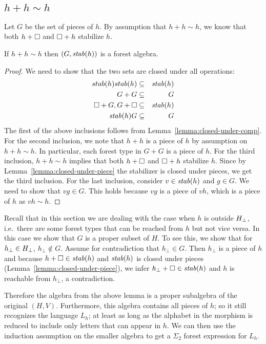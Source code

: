 \documentclass{LMCS}
\begin{document}
\subsection{\texorpdfstring{$h + h \sim h$}{h+h sim h}}
\label{sec:h-preserves-itself}
Let $G$ be the set of pieces of $h$. By assumption that $h+h \sim h$,
we know that both $h + \Box$ and $\Box + h$ stabilize $h$. 
\begin{lem}\label{lem:sub-forest-algebra}
  If $h + h \sim h$ then $(G,\mathit{stab}(h))$ is a forest
  algebra.
\end{lem}
\begin{proof}
    We need to show that the two sets are closed under all operations:
\begin{eqnarray*}
    stab(h) stab(h) & \subseteq &\mathit{stab}(h) \\
    G +  G &  \subseteq & G \\
 \Box +G, G + \Box     & \subseteq & \mathit{stab}(h) \\
    \mathit{stab}(h)  G & \subseteq & G
\end{eqnarray*}
  The first of the above inclusions follows from
  Lemma~\ref{lemma:closed-under-comp}. For the second inclusion, we
  note that $h+h$ is a piece of $h$ by assumption on $h+h \sim h$. In
  particular, each forest type in $G + G$ is a piece of $h$. For the
  third inclusion, $h+h \sim h$ implies that both $h + \Box$ and
  $\Box + h$ stabilize $h$. Since by
  Lemma~\ref{lemma:closed-under-piece} the stabilizer is closed under
  pieces, we get the third inclusion. For the last inclusion, consider
  $v \in \mathit{stab}(h)$ and $g \in G$. We need to show that $vg \in
  G$. This holds because $vg$ is a piece of $vh$, which is a piece of
  $h$ as $vh \sim h$.
\end{proof}


Recall that in this section we are dealing with the case when $h$ is
outside ${H_\bot}$, i.e.~there are some forest types that can be
reached from $h$ but not vice versa. In this case we show that $G$ is a proper
subset of $H$. To see this, we show that for $h_\bot \in {H_\bot}$, $h_\bot
\not\in G$. Assume for contradiction that $h_\bot \in G$. Then $h_\bot$ is a
piece of $h$ and because $h + \Box \in \mathit{stab}(h)$ and $\mathit{stab}(h)$ is closed
under pieces (Lemma~\ref{lemma:closed-under-piece}), we infer $h_\bot + \Box
\in \mathit{stab}(h)$ and $h$ is reachable from $h_\bot$, a contradiction.

Therefore the algebra from the above lemma is a
proper subalgebra of the original $(H,V)$.  Furthermore, this algebra
contains all pieces of $h$; so it still recognizes the language $L_h$;
at least as long as the alphabet in the morphism is reduced to include
only letters that can appear in $h$.  We can then use the induction
assumption on the smaller algebra to get a $\Sigma_2$ forest
expression for $L_h$.
\end{document}

